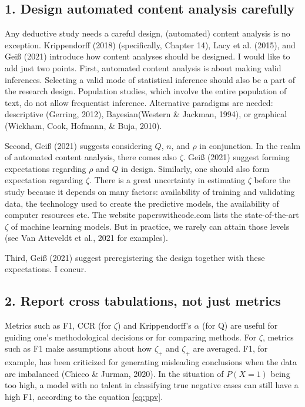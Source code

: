 \documentclass[english,man,floatsintext]{apa6}
\begin{document}
\hypertarget{design-automated-content-analysis-carefully}{%
\subsection{1. Design automated content analysis carefully}\label{design-automated-content-analysis-carefully}}

Any deductive study needs a careful design, (automated) content analysis is no exception. Krippendorff (2018) (specifically, Chapter 14), Lacy et al. (2015), and Geiß (2021) introduce how content analyses should be designed. I would like to add just two points. First, automated content analysis is about making valid inferences. Selecting a valid mode of statistical inference should also be a part of the research design. Population studies, which involve the entire population of text, do not allow frequentist inference. Alternative paradigms are needed: descriptive (Gerring, 2012), Bayesian(Western \& Jackman, 1994), or graphical (Wickham, Cook, Hofmann, \& Buja, 2010).

Second, Geiß (2021) suggests considering \(Q\), \(n\), and \(\rho\) in conjunction. In the realm of automated content analysis, there comes also \(\zeta\). Geiß (2021) suggest forming expectations regarding \(\rho\) and \(Q\) in design. Similarly, one should also form expectation regarding \(\zeta\). There is a great uncertainty in estimating \(\zeta\) before the study because it depends on many factors: availability of training and validating data, the technology used to create the predictive models, the availability of computer resources etc. The website paperswithcode.com lists the state-of-the-art \(\zeta\) of machine learning models. But in practice, we rarely can attain those levels (see Van Atteveldt et al., 2021 for examples).

Third, Geiß (2021) suggest preregistering the design together with these expectations. I concur.

\hypertarget{report-cross-tabulations-not-just-metrics}{%
\subsection{2. Report cross tabulations, not just metrics}\label{report-cross-tabulations-not-just-metrics}}

Metrics such as F1, CCR (for \(\zeta\)) and Krippendorff's \(\alpha\) (for Q) are useful for guiding one's methodological decisions or for comparing methods. For \(\zeta\), metrics such as F1 make assumptions about how \(\zeta_{+}\) and \(\zeta_{+}\) are averaged. F1, for example, has been criticized for generating misleading conclusions when the data are imbalanced (Chicco \& Jurman, 2020). In the situation of \(P(X=1)\) being too high, a model with no talent in classifying true negative cases can still have a high F1, according to the equation \eqref{eq:ppv}.
\end{document}
